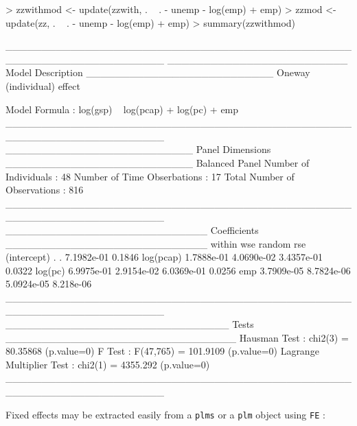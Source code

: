 \documentclass{article}
\begin{document}
\begin{Schunk}
\begin{Sinput}
> zzwithmod <- update(zzwith, . ~ . - unemp - log(emp) + emp)
> zzmod <- update(zz, . ~ . - unemp - log(emp) + emp)
> summary(zzwithmod)
\end{Sinput}
\begin{Soutput}
______________________________________________________________________ 
_________________________ Model Description __________________________
Oneway (individual) effect

Model Formula        : log(gsp) ~ log(pcap) + log(pc) + emp
______________________________________________________________________ 
__________________________ Panel Dimensions __________________________
Balanced Panel
Number of Individuals        :  48
Number of Time Obserbations  :  17
Total Number of Observations :  816
______________________________________________________________________ 
____________________________ Coefficients ____________________________
                within        wse     random       rse
(intercept)          .          . 7.1982e-01    0.1846
log(pcap)   1.7888e-01 4.0690e-02 3.4357e-01    0.0322
log(pc)     6.9975e-01 2.9154e-02 6.0369e-01    0.0256
emp         3.7909e-05 8.7824e-06 5.0924e-05 8.218e-06
______________________________________________________________________ 
_______________________________ Tests ________________________________
Hausman Test                   : chi2(3) = 80.35868 (p.value=0)
F Test                         : F(47,765) = 101.9109 (p.value=0)
Lagrange Multiplier Test       : chi2(1) = 4355.292 (p.value=0)
______________________________________________________________________ 
\end{Soutput}
\end{Schunk}

Fixed effects may be extracted easily from a \texttt{plms} or a
\texttt{plm} object using  \texttt{FE} :
\end{document}
